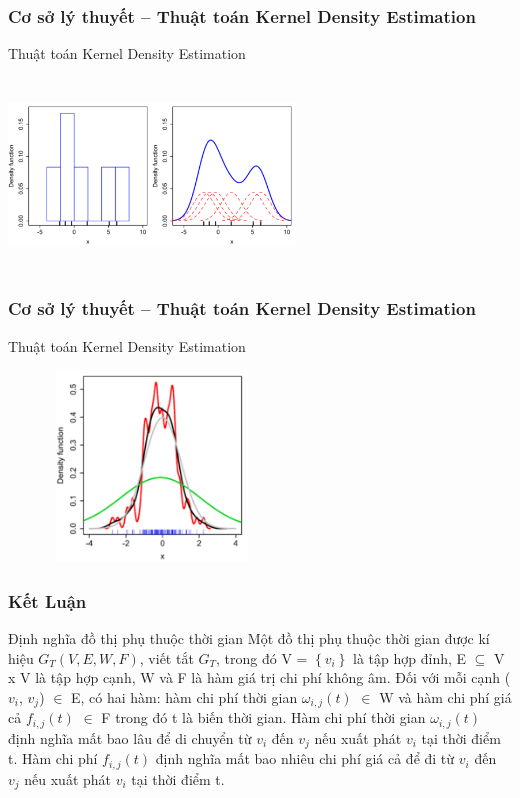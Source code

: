 \documentclass{beamer}
\begin{document}

\begin{frame}
\frametitle{Cơ sở lý thuyết -- Thuật toán Kernel Density Estimation}
Thuật toán Kernel Density Estimation
\begin{center}
\includegraphics[height=2in,width=3in]{500px-Comparison_of_1D_histogram_and_KDE.png}
\end{center}
\end{frame}


\begin{frame}
\frametitle{Cơ sở lý thuyết -- Thuật toán Kernel Density Estimation}
Thuật toán Kernel Density Estimation
\begin{center}
\includegraphics[height=2in,width=3in]{220px-Comparison_of_1D_bandwidth_selectors.png}
\end{center}
\end{frame}

\begin{frame}
\frametitle{Kết Luận}
\begin{block}{Định nghĩa đồ thị phụ thuộc thời gian}
Một đồ thị phụ thuộc thời gian được kí hiệu $G_{T}(V,E,W,F)$, viết tắt $G_{T}$, trong đó V = $\left \{ v_{i} \right \}$ là tập hợp đỉnh, E $\subseteq$ V x V là tập hợp cạnh, W và F là hàm giá trị chi phí không âm. Đối với mỗi cạnh ($v_{i}$, $v_{j}$) $\in$ E, có hai hàm: hàm chi phí thời gian $\omega_{i,j}(t)$ $\in$ W và hàm chi phí giá cả $f_{i,j}(t)$ $\in$ F trong đó t là biến thời gian. Hàm chi phí thời gian $\omega_{i,j}(t)$ định nghĩa mất bao lâu để di chuyển từ $v_{i}$ đến $v_{j}$ nếu xuất phát $v_{i}$ tại thời điểm t. Hàm chi phí $f_{i,j}(t)$ định nghĩa mất bao nhiêu chi phí giá cả để đi từ $v_{i}$ đến $v_{j}$ nếu xuất phát $v_{i}$ tại thời điểm t.
\end{block}
\end{frame}
\end{document}

